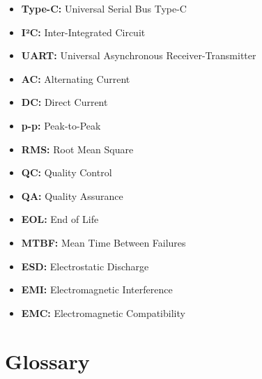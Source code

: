 \documentclass[a4paper,12pt]{article}
\begin{document}
\begin{itemize}
\item \textbf{Type-C:} Universal Serial Bus Type-C
\item \textbf{I²C:} Inter-Integrated Circuit
\item \textbf{UART:} Universal Asynchronous Receiver-Transmitter

\item \textbf{AC:} Alternating Current
\item \textbf{DC:} Direct Current
\item \textbf{p-p:} Peak-to-Peak
\item \textbf{RMS:} Root Mean Square

\item \textbf{QC:} Quality Control
\item \textbf{QA:} Quality Assurance
\item \textbf{EOL:} End of Life
\item \textbf{MTBF:} Mean Time Between Failures

\item \textbf{ESD:} Electrostatic Discharge
\item \textbf{EMI:} Electromagnetic Interference
\item \textbf{EMC:} Electromagnetic Compatibility

\end{itemize}

\newpage
\section{Glossary}
\end{document}
